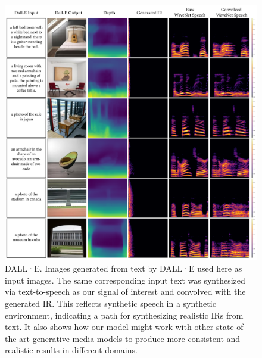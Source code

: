 \begin{figure}
    \centering
    \includegraphics[width=\textwidth]{p_dall-e.png}
    \caption{DALL·E. Images generated from text by DALL·E \cite{dalle} used here as input images. The same corresponding input text was synthesized via text-to-speech as our signal of interest and convolved with the generated IR.  This reflects synthetic speech in a synthetic environment, indicating a path for synthesizing realistic IRs from text. It also shows how our model might work with other state-of-the-art generative media models to produce more consistent and realistic results in different domains.}
    \label{fig:p_dall-e}
\end{figure}

